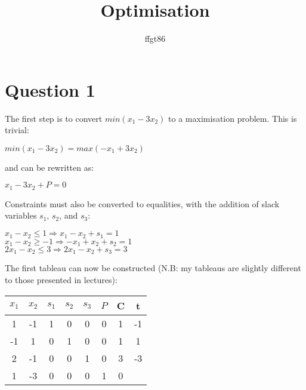 \documentclass[11pt]{article} %
\title{Optimisation}
\author{ffgt86}
\begin{document}
\maketitle

\section*{Question 1}

The first step is to convert $min(x_1 - 3x_2)$ to a maximisation problem. This is trivial:

\begin{center}

$min(x_1 - 3x_2) = max(-x_1 + 3x_2)$

\end{center}

and can be rewritten as:

\begin{center}

$x_1 - 3x_2 + P = 0$

\end{center}

Constraints must also be converted to equalities, with the addition of slack variables $s_1$, $s_2$, and $s_3$:

\begin{center}

$x_1 - x_2 \leq 1 \Rightarrow x_1 - x_2 + s_1 = 1$ \\
$x_1 - x_2 \geq -1 \Rightarrow -x_1 + x_2 + s_2 = 1$ \\
$2x_1 - x_2 \leq 3 \Rightarrow 2x_1 - x_2 + s_3 = 3$ 

\end{center}

The first tableau can now be constructed (N.B: my tableaus are slightly different to those presented in lectures):

\begin{center}

\begin{tabular}{ c c c c c c | c | c }
  $x_1$ & $x_2$ & $s_1$ & $s_2$ & $s_3$ & $P$ & C & t \\ \hline
  1 & -1 & 1 & 0 & 0 & 0 & 1 & -1\\
  -1 & 1 & 0 & 1 & 0 & 0 & 1 & 1\\
  2 & -1 & 0  & 0 & 1 & 0 & 3 & -3\\ \hline
  1 & -3 & 0 & 0 & 0 & 1 & 0 \\
\end{tabular}

\end{center}
\end{document}
